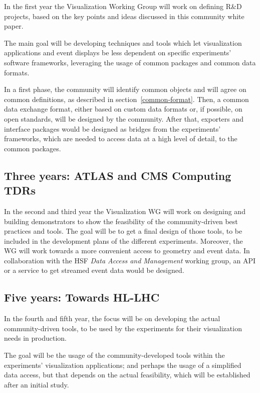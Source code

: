 \documentclass[12pt,a4paper]{article}
\begin{document}
In the first year the Visualization Working Group will work on defining R{\&}D projects, based on the key
points and ideas discussed in this community white paper.

The main goal will be developing techniques and tools which let visualization applications and event displays be
less dependent on specific experiments’ software frameworks, leveraging the usage of common packages and common data formats.

In a first phase, the community will identify common objects and will agree on common definitions, as described in
section~\ref{common-format}. Then, a common data exchange format, either based on custom data formats or, if possible, on
open standards, will be designed by the community. After that, exporters and interface packages would be designed
as bridges from the experiments’ frameworks, which are needed to access data at a high level of detail, to the common packages.

\hypertarget{three-year}{%
\subsection{Three years: ATLAS and CMS Computing TDRs}\label{three-year}}

In the second and third year the Visualization WG will work on designing and building demonstrators to show the feasibility of
the community-driven best practices and tools. The goal will be to get a final design of those tools, to be included in the development
plans of the different experiments. Moreover, the WG will work towards a more convenient access to geometry and event data.
In collaboration with the HSF \textit{Data Access and Management} working group, an API or a service to get streamed event data would be designed.

\hypertarget{five-year}{%
\subsection{Five years: Towards HL-LHC}\label{five-year}}

In the fourth and fifth year, the focus will be on developing the actual community-driven tools, to be used by the experiments
for their visualization needs in production.

The goal will be the usage of the community-developed tools within the experiments’ visualization applications; and
perhaps the usage of a simplified data access, but that depends on the actual feasibility, which will be established
after an initial study.
\end{document}
